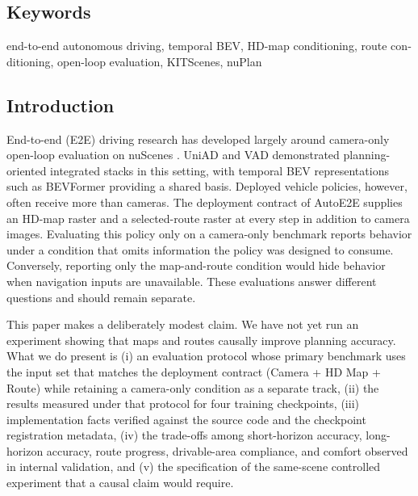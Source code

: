 \documentclass[
  english,
  10pt,
]{article}
\begin{document}
\begin{otherlanguage}{english}

\subsection{Keywords}\label{keywords}

end-to-end autonomous driving, temporal BEV, HD-map conditioning, route
conditioning, open-loop evaluation, KITScenes, nuPlan

\end{otherlanguage}

\subsection{Introduction}\label{introduction}

End-to-end (E2E) driving research has developed largely around
camera-only open-loop evaluation on nuScenes \hyperref[ref-nuscenes]{}.
UniAD \hyperref[ref-uniad]{}and VAD \hyperref[ref-vad]{}demonstrated
planning-oriented integrated stacks in this setting, with temporal BEV
representations such as BEVFormer \hyperref[ref-bevformer]{}providing a
shared basis. Deployed vehicle policies, however, often receive more
than cameras. The deployment contract of AutoE2E supplies an HD-map
raster and a selected-route raster at every step in addition to camera
images. Evaluating this policy only on a camera-only benchmark reports
behavior under a condition that omits information the policy was
designed to consume. Conversely, reporting only the map-and-route
condition would hide behavior when navigation inputs are unavailable.
These evaluations answer different questions and should remain separate.

This paper makes a deliberately modest claim. We have not yet run an
experiment showing that maps and routes causally improve planning
accuracy. What we do present is (i) an evaluation protocol whose primary
benchmark uses the input set that matches the deployment contract
(Camera + HD Map + Route) while retaining a camera-only condition as a
separate track, (ii) the results measured under that protocol for four
training checkpoints, (iii) implementation facts verified against the
source code and the checkpoint registration metadata, (iv) the
trade-offs among short-horizon accuracy, long-horizon accuracy, route
progress, drivable-area compliance, and comfort observed in internal
validation, and (v) the specification of the same-scene controlled
experiment that a causal claim would require.
\end{document}
